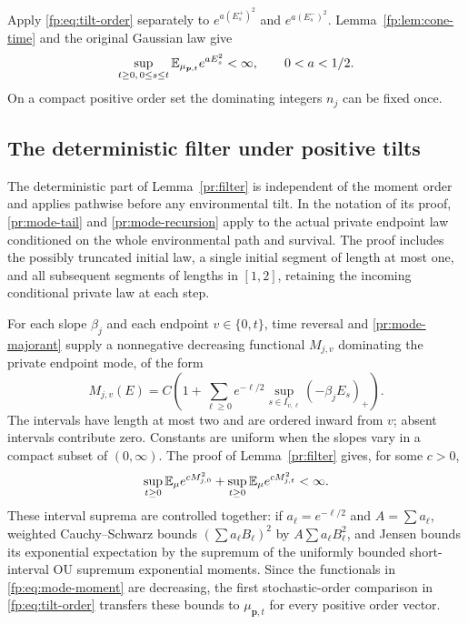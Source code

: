 Apply \eqref{fp:eq:tilt-order} separately to $e^{a(E_s^+)^2}$ and $e^{a(E_s^-)^2}$. Lemma~\ref{fp:lem:cone-time} and the original Gaussian law give
\begin{equation}\label{fp:eq:env-endpoint}
 \sup_{t\ge0,\,0\le s\le t}
 \mathbb E_{\mu_{\boldsymbol p,t}}e^{aE_s^2}<\infty,
 \qquad 0<a<1/2.
\end{equation}
On a compact positive order set the dominating integers $n_j$ can be fixed once.

\subsection{The deterministic filter under positive tilts}
The deterministic part of Lemma~\ref{pr:filter} is independent of the
moment order and applies pathwise before any environmental tilt.
In the notation of its proof,
\eqref{pr:mode-tail} and \eqref{pr:mode-recursion} apply to the actual
private endpoint law conditioned on the whole environmental path and
survival. The proof includes the possibly truncated initial law, a
single initial segment of length at most one, and all subsequent
segments of lengths in $[1,2]$, retaining the incoming conditional
private law at each step.

For each slope $\beta_j$ and each endpoint $v\in\{0,t\}$, time
reversal and \eqref{pr:mode-majorant} supply a nonnegative decreasing
functional $M_{j,v}$ dominating the private endpoint mode, of the form
\begin{equation}\label{fp:eq:mode-majorant}
 M_{j,v}(E)=C\left(1+\sum_{\ell\ge0}e^{-\ell/2}
                \sup_{s\in I_{v,\ell}}(-\beta_jE_s)_+\right).
\end{equation}
The intervals have length at most two and are ordered inward from
$v$; absent intervals contribute zero. Constants are uniform when
the slopes vary in a compact subset of $(0,\infty)$. The proof of
Lemma~\ref{pr:filter} gives, for some $c>0$,
\begin{equation}\label{fp:eq:mode-moment}
 \sup_{t\ge0}\mathbb E_\mu e^{cM_{j,0}^2}
 +\sup_{t\ge0}\mathbb E_\mu e^{cM_{j,t}^2}<\infty.
\end{equation}
These interval suprema are controlled together: if
$a_\ell=e^{-\ell/2}$ and $A=\sum a_\ell$, weighted
Cauchy--Schwarz bounds $(\sum a_\ell B_\ell)^2$ by
$A\sum a_\ell B_\ell^2$, and Jensen bounds its exponential
expectation by the supremum of the uniformly bounded short-interval
OU supremum exponential moments. Since the functionals in
\eqref{fp:eq:mode-moment} are decreasing, the first stochastic-order
comparison in \eqref{fp:eq:tilt-order} transfers these bounds to
$\mu_{\boldsymbol p,t}$ for every positive order vector.

